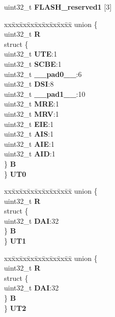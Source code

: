 \begin{DoxyCompactItemize}
\begin{tabbing}
\end{tabbing}\item 
\mbox{\label{structFLASH__tag_aba752a1675bb19ba698544e577831e29}} 
uint32\+\_\+t {\bfseries F\+L\+A\+S\+H\+\_\+reserved1} \mbox{[}3\mbox{]}
\item 
\mbox{\label{structFLASH__tag_a465e6fbaa4414db4b31072bd5585efaa}} 
\begin{tabbing}
xx\=xx\=xx\=xx\=xx\=xx\=xx\=xx\=xx\=\kill
union \{\\
\>uint32\_t {\bfseries R}\\
\>struct \{\\
\>\>uint32\_t {\bfseries UTE}:1\\
\>\>uint32\_t {\bfseries SCBE}:1\\
\>\>uint32\_t {\bfseries \_\_pad0\_\_}:6\\
\>\>uint32\_t {\bfseries DSI}:8\\
\>\>uint32\_t {\bfseries \_\_pad1\_\_}:10\\
\>\>uint32\_t {\bfseries MRE}:1\\
\>\>uint32\_t {\bfseries MRV}:1\\
\>\>uint32\_t {\bfseries EIE}:1\\
\>\>uint32\_t {\bfseries AIS}:1\\
\>\>uint32\_t {\bfseries AIE}:1\\
\>\>uint32\_t {\bfseries AID}:1\\
\>\} {\bfseries B}\\
\} {\bfseries UT0}\\

\end{tabbing}\item 
\mbox{\label{structFLASH__tag_a36dabc2f726be94fba37abe854785794}} 
\begin{tabbing}
xx\=xx\=xx\=xx\=xx\=xx\=xx\=xx\=xx\=\kill
union \{\\
\>uint32\_t {\bfseries R}\\
\>struct \{\\
\>\>uint32\_t {\bfseries DAI}:32\\
\>\} {\bfseries B}\\
\} {\bfseries UT1}\\

\end{tabbing}\item 
\mbox{\label{structFLASH__tag_a1833c815ebf12fd0a11145a32f07a267}} 
\begin{tabbing}
xx\=xx\=xx\=xx\=xx\=xx\=xx\=xx\=xx\=\kill
union \{\\
\>uint32\_t {\bfseries R}\\
\>struct \{\\
\>\>uint32\_t {\bfseries DAI}:32\\
\>\} {\bfseries B}\\
\} {\bfseries UT2}\\


\end{tabbing}
\end{DoxyCompactItemize}
